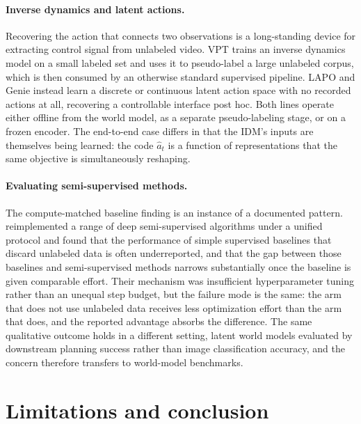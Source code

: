 \documentclass{article}
\begin{document}
\paragraph{Inverse dynamics and latent actions.}
Recovering the action that connects two observations is a long-standing device for
extracting control signal from unlabeled video. VPT \citep{baker2022vpt} trains an
inverse dynamics model on a small labeled set and uses it to pseudo-label a large
unlabeled corpus, which is then consumed by an otherwise standard supervised
pipeline. LAPO \citep{schmidt2024lapo} and Genie \citep{bruce2024genie} instead
learn a discrete or continuous latent action space with no recorded actions at all,
recovering a controllable interface post hoc. Both lines operate either offline from
the world model, as a separate pseudo-labeling stage, or on a frozen encoder. The
end-to-end case differs in that the IDM's inputs are themselves being learned: the
code $\hat a_t$ is a function of representations that the same objective is
simultaneously reshaping.

\paragraph{Evaluating semi-supervised methods.}
The compute-matched baseline finding is an instance of a documented pattern.
\citet{oliver2018realistic} reimplemented a range of deep semi-supervised algorithms
under a unified protocol and found that the performance of simple supervised
baselines that discard unlabeled data is often underreported, and that the gap
between those baselines and semi-supervised methods narrows substantially once the
baseline is given comparable effort. Their mechanism was insufficient hyperparameter
tuning rather than an unequal step budget, but the failure mode is the same: the arm
that does not use unlabeled data receives less optimization effort than the arm that
does, and the reported advantage absorbs the difference. The same qualitative outcome
holds in a different setting, latent world models evaluated by downstream planning
success rather than image classification accuracy, and the concern therefore
transfers to world-model benchmarks.

\section{Limitations and conclusion}
\label{sec:conclusion}
\end{document}
